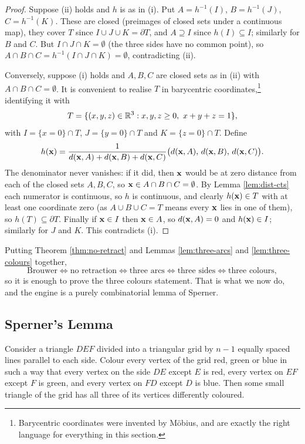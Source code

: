 \documentclass[a4paper]{scrartcl}
\begin{document}
\begin{proof}
	Suppose (ii) holds and $h$ is as in (i). Put $A = h^{-1}(I)$, $B = h^{-1}(J)$, $C = h^{-1}(K)$. These are closed (preimages of closed sets under a continuous map), they cover $T$ since $I \cup J\cup K = \partial T$, and $A \supseteq I$ since $h(I)\subseteq I$; similarly for $B$ and $C$. But $I \cap J \cap K = \emptyset$ (the three sides have no common point), so $A\cap B\cap C = h^{-1}(I\cap J\cap K) = \emptyset$, contradicting (ii).

	Conversely, suppose (i) holds and $A,B,C$ are closed sets as in (ii) with $A\cap B\cap C = \emptyset$. It is convenient to realise $T$ in barycentric coordinates,\footnote{Barycentric coordinates were invented by M\"obius, and are exactly the right language for everything in this section.} identifying it with
	$$T = \{(x,y,z) \in \R^3 : x,y,z\geq 0,\ x+y+z = 1\},$$
	with $I = \{x = 0\}\cap T$, $J = \{y=0\}\cap T$ and $K = \{z=0\}\cap T$. Define
	$$h(\mathbf{x}) = \frac{1}{d(\mathbf{x},A)+d(\mathbf{x},B)+d(\mathbf{x},C)}\big(d(\mathbf{x},A),\, d(\mathbf{x},B),\, d(\mathbf{x},C)\big).$$
	The denominator never vanishes: if it did, then $\mathbf{x}$ would be at zero distance from each of the closed sets $A,B,C$, so $\mathbf{x} \in A\cap B\cap C = \emptyset$. By Lemma \ref{lem:dist-cts} each numerator is continuous, so $h$ is continuous, and clearly $h(\mathbf{x}) \in T$ with at least one coordinate zero (as $A\cup B\cup C = T$ means every $\mathbf{x}$ lies in one of them), so $h(T)\subseteq \partial T$. Finally if $\mathbf{x} \in I$ then $\mathbf{x}\in A$, so $d(\mathbf{x},A)=0$ and $h(\mathbf{x}) \in I$; similarly for $J$ and $K$. This contradicts (i).
\end{proof}

Putting Theorem \ref{thm:no-retract} and Lemmas \ref{lem:three-arcs} and \ref{lem:three-colours} together,
$$\text{Brouwer} \iff \text{no retraction} \iff \text{three arcs} \iff \text{three sides} \iff \text{three colours},$$
so it is enough to prove the three colours statement. That is what we now do, and the engine is a purely combinatorial lemma of Sperner.

\subsection{Sperner's Lemma}

\begin{lemma}[Sperner]\label{lem:sperner}
	Consider a triangle $DEF$ divided into a triangular grid by $n-1$ equally spaced lines parallel to each side. Colour every vertex of the grid red, green or blue in such a way that every vertex on the side $DE$ except $E$ is red, every vertex on $EF$ except $F$ is green, and every vertex on $FD$ except $D$ is blue. Then some small triangle of the grid has all three of its vertices differently coloured.
\end{lemma}
\end{document}
